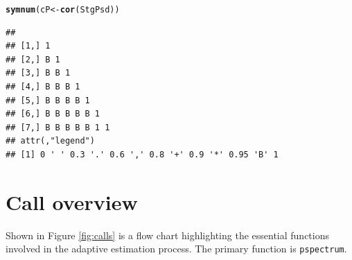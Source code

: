 \documentclass[10pt]{article}\usepackage{graphicx, color}
\makeatletter
\newcommand{\hlfunctioncall}[1]{\textcolor[rgb]{0.501960784313725,0,0.329411764705882}{\textbf{#1}}}%
\newenvironment{kframe}{%
 \def\at@end@of@kframe{}%
 \ifinner\ifhmode%
  \def\at@end@of@kframe{\end{minipage}}%
  \begin{minipage}{\columnwidth}%
 \fi\fi%
 \def\FrameCommand##1{\hskip\@totalleftmargin \hskip-\fboxsep
 \colorbox{shadecolor}{##1}\hskip-\fboxsep
     \hskip-\linewidth \hskip-\@totalleftmargin \hskip\columnwidth}%
 \MakeFramed {\advance\hsize-\width
   \@totalleftmargin\z@ \linewidth\hsize
   \@setminipage}}%
 {\par\unskip\endMakeFramed%
 \at@end@of@kframe}
\newenvironment{knitrout}{}{} %
\newcommand{\Rcmd}[1]{\texttt{#1}}
\makeatother
\begin{document}
\begin{knitrout}
\color{fgcolor}\begin{kframe}
\begin{alltt}
\hlfunctioncall{symnum}(cP <- \hlfunctioncall{cor}(StgPsd))
\end{alltt}
\begin{verbatim}
##                   
## [1,] 1            
## [2,] B 1          
## [3,] B B 1        
## [4,] B B B 1      
## [5,] B B B B 1    
## [6,] B B B B B 1  
## [7,] B B B B B 1 1
## attr(,"legend")
## [1] 0 ' ' 0.3 '.' 0.6 ',' 0.8 '+' 0.9 '*' 0.95 'B' 1
\end{verbatim}
\end{kframe}
\end{knitrout}



\section{Call overview}

Shown
in Figure \ref{fig:calls}
is a flow chart 
highlighting the essential
functions involved in the adaptive estimation
process. The primary function is \Rcmd{pspectrum}.
\end{document}
